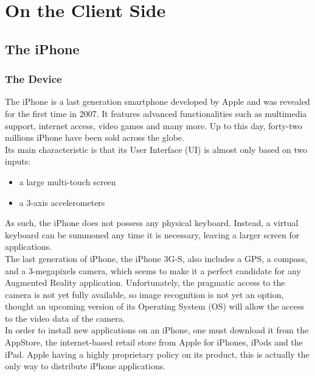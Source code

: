 \chapter{On the Client Side}
\label{cha:on_the_client_side}

\section{The iPhone}
\label{sec:the_iphone}

\subsection{The Device}
The iPhone is a last generation smartphone developed by Apple and was revealed for the first time in 2007. It features advanced functionalities such as multimedia support, internet access, video games and many more. Up to this day, forty-two millions iPhone have been sold across the globe.\\

Its main characteristic is that its User Interface (UI) is almost only based on two inputs:
\begin{itemize}
\item{a large multi-touch screen}
\item{a 3-axis accelerometers}
\end{itemize}
As such, the iPhone does not possess any physical keyboard. Instead, a virtual keyboard can be summoned any time it is necessary, leaving a larger screen for applications.\\

The last generation of iPhone, the iPhone 3G-S, also includes a GPS, a compass, and a 3-megapixels camera, which seems to make it a perfect candidate for any Augmented Reality application. Unfortunately, the pragmatic access to the camera is not yet fully available, so image recognition is not yet an option, thought an upcoming version of its Operating System (OS) will allow the access to the video data of the camera.\\

In order to install new applications on an iPhone, one must download it from the AppStore, the internet-based retail store from Apple for iPhones, iPods and the iPad. Apple having a highly proprietary policy on its product, this is actually the only way to distribute iPhone applications.


